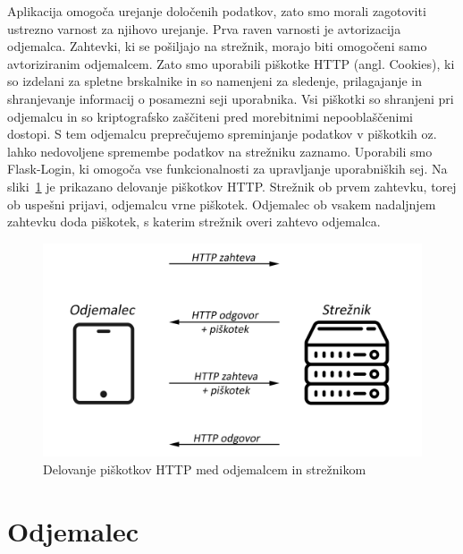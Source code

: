 \documentclass[a4paper, 12pt]{book}
\begin{document}
Aplikacija omogoča urejanje določenih podatkov, zato smo morali zagotoviti ustrezno varnost za njihovo urejanje. Prva raven varnosti je avtorizacija odjemalca. Zahtevki, ki se pošiljajo na strežnik, morajo biti omogočeni samo avtoriziranim odjemalcem. Zato smo uporabili piškotke HTTP (angl. Cookies), ki so izdelani za spletne brskalnike in so namenjeni za sledenje, prilagajanje in shranjevanje informacij o posamezni seji uporabnika. Vsi piškotki so shranjeni pri odjemalcu in so kriptografsko zaščiteni pred morebitnimi nepooblaščenimi dostopi. S tem odjemalcu preprečujemo spreminjanje podatkov v piškotkih oz. lahko nedovoljene spremembe podatkov na strežniku zaznamo. Uporabili smo Flask-Login, ki omogoča vse funkcionalnosti za upravljanje uporabniških sej. 
Na sliki~\ref{Cookies} je prikazano delovanje piškotkov HTTP. Strežnik ob prvem zahtevku, torej ob uspešni prijavi, odjemalcu vrne piškotek. Odjemalec ob vsakem nadaljnjem zahtevku doda piškotek, s katerim strežnik overi zahtevo odjemalca.

\begin{figure}[!htb]
\begin{center}
\includegraphics[width=13.5cm]{cookie-how1.png}
\caption{Delovanje piškotkov HTTP med odjemalcem in strežnikom}
\label{Cookies}
\end{center}
\end{figure}

\section{Odjemalec}
\end{document}
